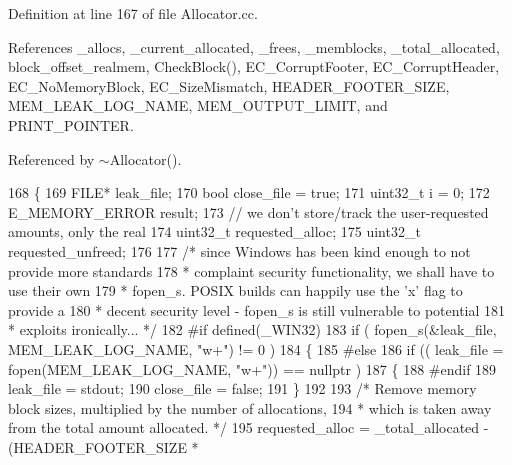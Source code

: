 Definition at line 167 of file Allocator.\-cc.



References \-\_\-allocs, \-\_\-current\-\_\-allocated, \-\_\-frees, \-\_\-memblocks, \-\_\-total\-\_\-allocated, block\-\_\-offset\-\_\-realmem, Check\-Block(), E\-C\-\_\-\-Corrupt\-Footer, E\-C\-\_\-\-Corrupt\-Header, E\-C\-\_\-\-No\-Memory\-Block, E\-C\-\_\-\-Size\-Mismatch, H\-E\-A\-D\-E\-R\-\_\-\-F\-O\-O\-T\-E\-R\-\_\-\-S\-I\-Z\-E, M\-E\-M\-\_\-\-L\-E\-A\-K\-\_\-\-L\-O\-G\-\_\-\-N\-A\-M\-E, M\-E\-M\-\_\-\-O\-U\-T\-P\-U\-T\-\_\-\-L\-I\-M\-I\-T, and P\-R\-I\-N\-T\-\_\-\-P\-O\-I\-N\-T\-E\-R.



Referenced by $\sim$\-Allocator().


\begin{DoxyCode}
168 \{
169         FILE*           leak\_file;
170         \textcolor{keywordtype}{bool}            close\_file = \textcolor{keyword}{true};
171         uint32\_t        i = 0;
172         E_MEMORY_ERROR  result;
173         \textcolor{comment}{// we don't store/track the user-requested amounts, only the real}
174         uint32\_t        requested\_alloc;
175         uint32\_t        requested\_unfreed;
176 
177         \textcolor{comment}{/* since Windows has been kind enough to not provide more standards
}
178 \textcolor{comment}{         * complaint security functionality, we shall have to use their own
}
179 \textcolor{comment}{         * fopen\_s. POSIX builds can happily use the 'x' flag to provide a
}
180 \textcolor{comment}{         * decent security level - fopen\_s is still vulnerable to potential
}
181 \textcolor{comment}{         * exploits ironically... */}
182 \textcolor{preprocessor}{#if defined(\_WIN32)
}
183 \textcolor{preprocessor}{}        \textcolor{keywordflow}{if} ( fopen\_s(&leak\_file, MEM_LEAK_LOG_NAME, \textcolor{stringliteral}{"w+"}) != 0 )
184         \{
185 \textcolor{preprocessor}{#else
}
186 \textcolor{preprocessor}{}        \textcolor{keywordflow}{if} (( leak\_file = fopen(MEM_LEAK_LOG_NAME, \textcolor{stringliteral}{"w+"})) == \textcolor{keyword}{nullptr} )
187         \{
188 \textcolor{preprocessor}{#endif
}
189 \textcolor{preprocessor}{}                leak\_file = stdout;
190                 close\_file = \textcolor{keyword}{false};
191         \}
192 
193         \textcolor{comment}{/* Remove memory block sizes, multiplied by the number of allocations,
}
194 \textcolor{comment}{         * which is taken away from the total amount allocated. */}
195         requested\_alloc         = _total_allocated - (HEADER_FOOTER_SIZE * 

\end{DoxyCode}

